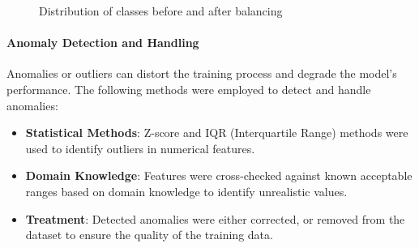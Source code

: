 \begin{figure}[ht!]
	\centering
	\hfill
	\caption{Distribution of classes before and after balancing}
	\label{fig:comparison}
\end{figure}


\paragraph{Anomaly Detection and Handling}
Anomalies or outliers can distort the training process and degrade the model's performance. The following methods were employed to detect and handle anomalies:
\begin{itemize}
    \item \textbf{Statistical Methods}: Z-score and IQR (Interquartile Range) methods were used to identify outliers in numerical features.
    \item \textbf{Domain Knowledge}: Features were cross-checked against known acceptable ranges based on domain knowledge to identify unrealistic values.
    \item \textbf{Treatment}: Detected anomalies were either corrected, or removed from the dataset to ensure the quality of the training data.
\end{itemize}

